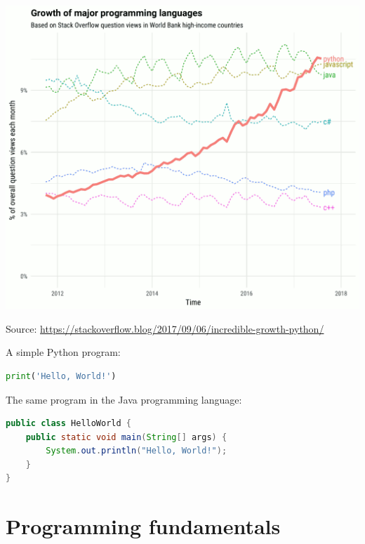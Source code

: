 \documentclass[aspectratio=169,usenames,dvipsnames]{beamer}
\begin{document}
\begin{frame}

    \centering
    \includegraphics[height=0.9\textheight]{fig/pythongrowth.png}

    Source: \url{https://stackoverflow.blog/2017/09/06/incredible-growth-python/}
\end{frame}

\begin{frame}[fragile]
A simple Python program:
\begin{lstlisting}[language=python]
print('Hello, World!')
\end{lstlisting}

\pause
\vspace{1em}
The same program in the Java programming language:

\begin{lstlisting}[language=java]
public class HelloWorld {
    public static void main(String[] args) {
        System.out.println("Hello, World!");
    }
}
\end{lstlisting}
\end{frame}


\section{Programming fundamentals}
\end{document}
